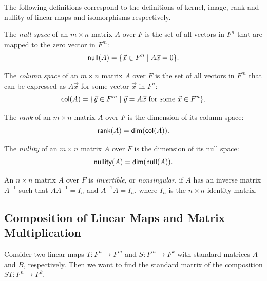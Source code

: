 The following definitions correspond to the definitions of kernel, image, rank and nullity of linear maps and isomorphisms respectively.

\begin{definition}\label{def:null_space}
  The \emph{null space} of an $m \times n$ matrix $A$ over $F$ is the set of all vectors in $F^n$ that are mapped to the zero vector in $F^m$:
  \[
    \operatorname{\text{\normalfont\sffamily null}}(A) = \{ \vec{x} \in F^n \mid A \vec{x} = 0 \}.
  \]
\end{definition}

\begin{definition}\label{def:column_space}
  The \emph{column space} of an $m \times n$ matrix $A$ over $F$ is the set of all vectors in $F^m$ that can be expressed as $A \vec{x}$ for some vector $\vec{x}$ in $F^n$:
  \[
    \operatorname{\text{\normalfont\sffamily col}}(A) = \{ \vec{y} \in F^m \mid \vec{y} = A \vec{x} \text{ for some } \vec{x} \in F^n \}.
  \]
\end{definition}

\begin{definition}[Rank]\label{def:matrix_rank}
  The \emph{rank} of an $m \times n$ matrix $A$ over $F$ is the dimension of its \hyperref[def:column_space]{column space}:
  \[
    \operatorname{\text{\normalfont\sffamily rank}}(A) = \operatorname{\text{\normalfont\sffamily dim}}(\operatorname{\text{\normalfont\sffamily col}}(A)).
  \]
\end{definition}

\begin{definition}[Nullity]\label{def:matrix_nullity}
  The \emph{nullity} of an $m \times n$ matrix $A$ over $F$ is the dimension of its \hyperref[def:null_space]{null space}:
  \[
    \operatorname{\text{\normalfont\sffamily nullity}}(A) = \operatorname{\text{\normalfont\sffamily dim}}(\operatorname{\text{\normalfont\sffamily null}}(A)).
  \]
\end{definition}

\begin{definition}\label{def:invertible_matrix}
  An $n \times n$ matrix $A$ over $F$ is \emph{invertible}, or \emph{nonsingular}, if $A$ has an inverse matrix $A^{-1}$ such that $A A^{-1} = I_n$ and $A^{-1} A = I_n$, where $I_n$ is the $n \times n$ identity matrix.
\end{definition}

\subsection{Composition of Linear Maps and Matrix Multiplication}

Consider two linear maps $T \colon F^n \to F^m$ and $S \colon F^m \to F^k$ with standard matrices $A$ and $B$, respectively. Then we want to find the standard matrix of the composition $ST \colon F^n \to F^k$.
\begin{center}
\end{center}

